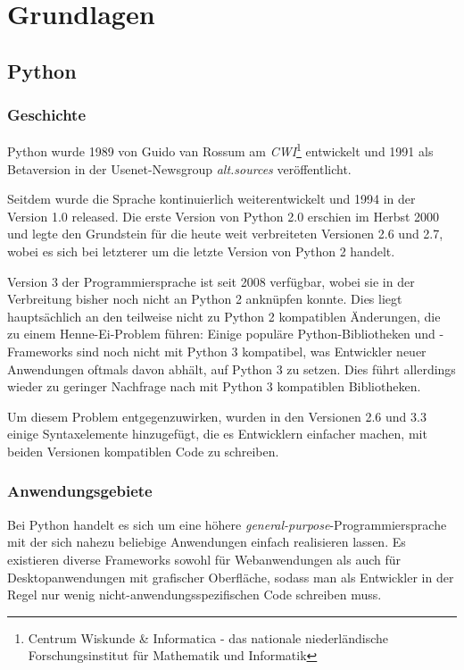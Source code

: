 \chapter{Grundlagen}

\section{Python}

\subsection{Geschichte}

Python wurde 1989 von Guido van Rossum am \emph{CWI}\footnote{Centrum Wiskunde \& Informatica - das
nationale niederländische Forschungsinstitut für Mathematik und Informatik} entwickelt und 1991 als
Betaversion in der Usenet-Newsgroup \emph{alt.sources} veröffentlicht.

Seitdem wurde die Sprache kontinuierlich weiterentwickelt und 1994 in der Version 1.0 released. Die
erste Version von Python 2.0 erschien im Herbst 2000 und legte den Grundstein für die heute weit
verbreiteten Versionen 2.6 und 2.7, wobei es sich bei letzterer um die letzte Version von Python 2
handelt.

Version 3 der Programmiersprache ist seit 2008 verfügbar, wobei sie in der Verbreitung bisher noch
nicht an Python 2 anknüpfen konnte. Dies liegt hauptsächlich an den teilweise nicht zu Python 2
kompatiblen Änderungen, die zu einem Henne-Ei-Problem führen: Einige populäre Python-Bibliotheken
und -Frameworks sind noch nicht mit Python 3 kompatibel, was Entwickler neuer Anwendungen oftmals
davon abhält, auf Python 3 zu setzen. Dies führt allerdings wieder zu geringer Nachfrage nach mit
Python 3 kompatiblen Bibliotheken. \citep{pywiki:2or3}

Um diesem Problem entgegenzuwirken, wurden in den Versionen 2.6 und 3.3 einige Syntaxelemente
hinzugefügt, die es Entwicklern einfacher machen, mit beiden Versionen kompatiblen Code zu
schreiben. \citep{pep:414}


\subsection{Anwendungsgebiete}

Bei Python handelt es sich um eine höhere \emph{general-purpose}-Programmiersprache mit der sich
nahezu beliebige Anwendungen einfach realisieren lassen. Es existieren diverse Frameworks sowohl für
Webanwendungen als auch für Desktopanwendungen mit grafischer Oberfläche, sodass man als Entwickler
in der Regel nur wenig nicht-anwendungsspezifischen Code schreiben muss.

